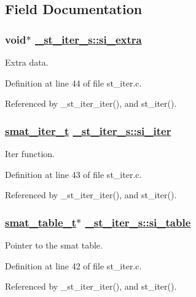 \subsection{Field Documentation}
\hypertarget{struct__st__iter__s_o2}{
\subsubsection[si\_\-extra]{\setlength{\rightskip}{0pt plus 5cm}void$\ast$ \hyperlink{struct__st__iter__s_o2}{\_\-st\_\-iter\_\-s::si\_\-extra}}}
\label{struct__st__iter__s_o2}


Extra data. 

Definition at line 44 of file st\_\-iter.c.

Referenced by \_\-st\_\-iter\_\-iter(), and st\_\-iter().\hypertarget{struct__st__iter__s_o1}{
\subsubsection[si\_\-iter]{\setlength{\rightskip}{0pt plus 5cm}\hyperlink{group__dbprim__smat_ga4}{smat\_\-iter\_\-t} \hyperlink{struct__st__iter__s_o1}{\_\-st\_\-iter\_\-s::si\_\-iter}}}
\label{struct__st__iter__s_o1}


Iter function. 

Definition at line 43 of file st\_\-iter.c.

Referenced by \_\-st\_\-iter\_\-iter(), and st\_\-iter().\hypertarget{struct__st__iter__s_o0}{
\subsubsection[si\_\-table]{\setlength{\rightskip}{0pt plus 5cm}\hyperlink{struct__smat__table__s}{smat\_\-table\_\-t}$\ast$ \hyperlink{struct__st__iter__s_o0}{\_\-st\_\-iter\_\-s::si\_\-table}}}
\label{struct__st__iter__s_o0}


Pointer to the smat table. 

Definition at line 42 of file st\_\-iter.c.

Referenced by \_\-st\_\-iter\_\-iter(), and st\_\-iter().